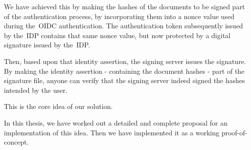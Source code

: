 We have achieved this by making the hashes of the documents to be signed part of the authentication process,
by incorporating them into a nonce value used during the~\gls{OIDC} authentication.
The authentication token subsequently issued by the~\gls{IDP} contains that same nonce value,
but now protected by a digital signature issued by the~\gls{IDP}.

Then, based upon that identity assertion, the signing server issues the signature.
By making the identity assertion - containing the document hashes - part of the signature file,
anyone can verify that the signing server indeed signed the hashes intended by the user.

This is the core idea of our solution.

In this thesis, we have worked out a detailed and complete proposal for an implementation of this idea.
Then we have implemented it as a working proof-of-concept.

